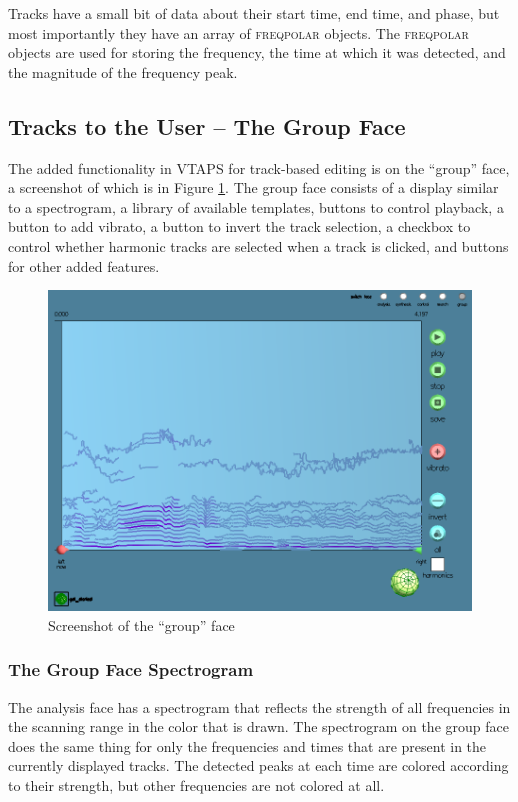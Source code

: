 \documentclass{article}
\newcommand{\noun}[1]{\textsc{#1}}
\begin{document}
Tracks have a small bit of data about their start time, end time, and phase,
but most importantly they have an array of \noun{freqpolar} objects. The
\noun{freqpolar} objects are used for storing the frequency, the time at which
it was detected, and the magnitude of the frequency peak.

\subsection{Tracks to the User -- The Group Face}

The added functionality in VTAPS for track-based editing is on the ``group''
face, a screenshot of which is in Figure \ref{fig:group-face}. The group face
consists of a display similar to a spectrogram, a library of available
templates, buttons to control playback, a button to add vibrato, a button to
invert the track selection, a checkbox to control whether harmonic tracks are
selected when a track is clicked, and buttons for other added features.

\begin{figure}
\includegraphics[scale=0.25]{images/group}

\caption{\label{fig:group-face}Screenshot of the ``group'' face}
\end{figure}

\subsubsection{The Group Face Spectrogram}

The analysis face has a spectrogram that reflects the strength of all
frequencies in the scanning range in the color that is drawn. The spectrogram
on the group face does the same thing for only the frequencies and times that
are present in the currently displayed tracks. The detected peaks at each time
are colored according to their strength, but other frequencies are not colored
at all.
\end{document}
